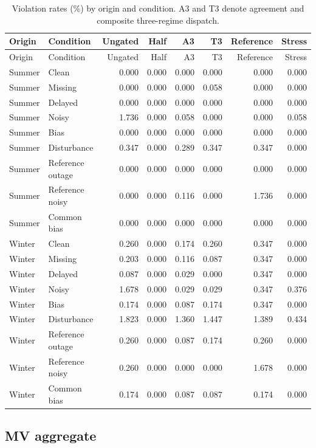 \documentclass[11pt]{article}
\begin{document}
\small\begin{longtable}{llrrrrrr}
\caption{Violation rates (\%) by origin and condition. A3 and T3 denote agreement and composite three-regime dispatch.}\\\toprule
Origin & Condition & Ungated & Half & A3 & T3 & Reference & Stress\\\midrule
\endfirsthead
\toprule
Origin & Condition & Ungated & Half & A3 & T3 & Reference & Stress\\\midrule
\endhead
\bottomrule\endfoot
Summer & Clean & 0.000 & 0.000 & 0.000 & 0.000 & 0.000 & 0.000\\
Summer & Missing & 0.000 & 0.000 & 0.000 & 0.058 & 0.000 & 0.000\\
Summer & Delayed & 0.000 & 0.000 & 0.000 & 0.000 & 0.000 & 0.000\\
Summer & Noisy & 1.736 & 0.000 & 0.058 & 0.000 & 0.000 & 0.058\\
Summer & Bias & 0.000 & 0.000 & 0.000 & 0.000 & 0.000 & 0.000\\
Summer & Disturbance & 0.347 & 0.000 & 0.289 & 0.347 & 0.347 & 0.000\\
Summer & Reference outage & 0.000 & 0.000 & 0.000 & 0.000 & 0.000 & 0.000\\
Summer & Reference noisy & 0.000 & 0.000 & 0.116 & 0.000 & 1.736 & 0.000\\
Summer & Common bias & 0.000 & 0.000 & 0.000 & 0.000 & 0.000 & 0.000\\
Winter & Clean & 0.260 & 0.000 & 0.174 & 0.260 & 0.347 & 0.000\\
Winter & Missing & 0.203 & 0.000 & 0.116 & 0.087 & 0.347 & 0.000\\
Winter & Delayed & 0.087 & 0.000 & 0.029 & 0.000 & 0.347 & 0.000\\
Winter & Noisy & 1.678 & 0.000 & 0.029 & 0.029 & 0.347 & 0.376\\
Winter & Bias & 0.174 & 0.000 & 0.087 & 0.174 & 0.347 & 0.000\\
Winter & Disturbance & 1.823 & 0.000 & 1.360 & 1.447 & 1.389 & 0.434\\
Winter & Reference outage & 0.260 & 0.000 & 0.087 & 0.174 & 0.260 & 0.000\\
Winter & Reference noisy & 0.260 & 0.000 & 0.000 & 0.000 & 1.678 & 0.000\\
Winter & Common bias & 0.174 & 0.000 & 0.087 & 0.087 & 0.174 & 0.000\\
\end{longtable}\normalsize
{}\subsection{MV aggregate}
\end{document}
